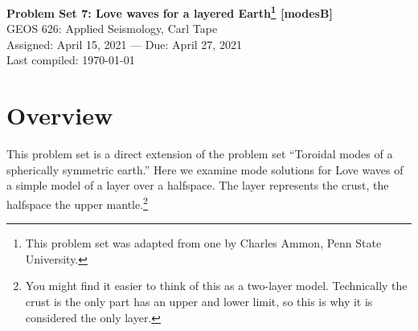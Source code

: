 \documentclass[11pt,titlepage,fleqn]{article}
\begin{document}

\begin{spacing}{1.2}
\centering
{\large \bf Problem Set 7: Love waves for a layered Earth\footnote{This problem set was adapted from one by Charles Ammon, Penn State University.} [modesB]} \\
GEOS 626: Applied Seismology, Carl Tape \\
Assigned: April 15, 2021 --- Due: April 27, 2021 \\
Last compiled: \today
\end{spacing}


\section*{Overview}

This problem set is a direct extension of the problem set ``Toroidal modes of a spherically symmetric earth.'' Here we examine mode solutions for Love waves of a simple model of a layer over a halfspace. The layer represents the crust, the halfspace the upper mantle.\footnote{You might find it easier to think of this as a two-layer model. Technically the crust is the only part has an upper and lower limit, so this is why it is considered the only layer.}
\end{document}
